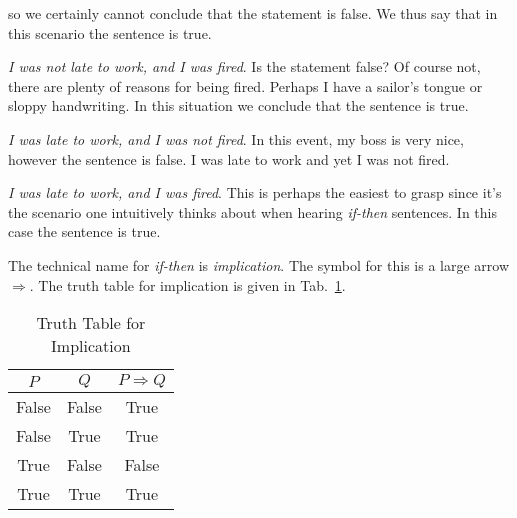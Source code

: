 \documentclass{article}
\theoremstyle{plain}
\theoremstyle{normal}
\begin{document}
            so we certainly cannot conclude that the statement is false. We
            thus say that in this scenario the sentence is true.
            \par\hfill\par
            \textit{I was not late to work, and I was fired}. Is the statement
            false? Of course not, there are plenty of reasons for being fired.
            Perhaps I have a sailor's tongue or sloppy handwriting. In this
            situation we conclude that the sentence is true.
            \par\hfill\par
            \textit{I was late to work, and I was not fired}. In this event, my
            boss is very nice, however the sentence is false. I was late to work
            and yet I was not fired.
            \par\hfill\par
            \textit{I was late to work, and I was fired}. This is perhaps the
            easiest to grasp since it's the scenario one intuitively thinks
            about when hearing \textit{if-then} sentences. In this case the
            sentence is true.
            \par\hfill\par
            The technical name for \textit{if-then} is \textit{implication}. The
            symbol for this is a large arrow
            $\Rightarrow$. The truth table for implication is given in
            Tab.~\ref{tab:truth_table_implication}.
            \begin{table}
                \centering
                \begin{tabular}{c | c | c}
                    $P$&$Q$&$P\Rightarrow{Q}$\\
                    \hline
                    False&False&True\\
                    \hline
                    False&True&True\\
                    \hline
                    True&False&False\\
                    \hline
                    True&True&True
                \end{tabular}
                \caption{Truth Table for Implication}
                \label{tab:truth_table_implication}
            \end{table}
\end{document}
